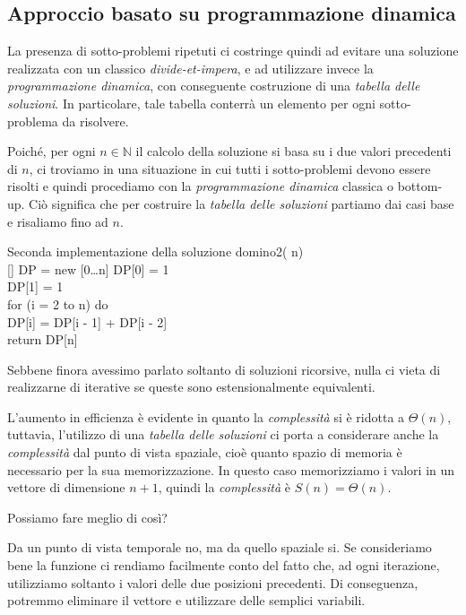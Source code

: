 \subsection{Approccio basato su programmazione dinamica}
La presenza di sotto-problemi ripetuti ci costringe quindi ad evitare una
soluzione realizzata con un classico \emph{divide-et-impera}, e ad utilizzare
invece la \emph{programmazione dinamica}, con conseguente costruzione di una
\emph{tabella delle soluzioni}. In particolare, tale tabella conterrà un elemento
per ogni sotto-problema da risolvere.

Poiché, per ogni $n\in\mathbb{N}$ il calcolo della soluzione si basa su i due
valori precedenti di $n$, ci troviamo in una situazione in cui tutti i
sotto-problemi devono essere risolti e quindi procediamo con la
\emph{programmazione dinamica} classica o bottom-up. Ciò significa che per
costruire la \emph{tabella delle soluzioni} partiamo dai casi base e risaliamo
fino ad $n$.

\begin{minicode}{Seconda implementazione della soluzione}
    \ind{} domino2( n)\\
        [] DP = new [0\dots n]\hfill{}
        DP[0] = 1\\
        DP[1] = 1\\
        \indf for (i = 2 to n) do\\
            DP[i] = DP[i - 1] + DP[i - 2]\\
        \indf return DP[n]
\end{minicode}
\begin{note}
    Sebbene finora avessimo parlato soltanto di soluzioni ricorsive, nulla ci
    vieta di realizzarne di iterative se queste sono estensionalmente equivalenti.
\end{note}\noindent
L'aumento in efficienza è evidente in quanto la \emph{complessità} si è ridotta
a $\Theta(n)$, tuttavia, l'utilizzo di una \emph{tabella delle soluzioni} ci
porta a considerare anche la \emph{complessità} dal punto di vista spaziale, cioè
quanto spazio di memoria è necessario per la sua memorizzazione. In questo caso
memorizziamo i valori in un vettore di dimensione $n+1$, quindi la
\emph{complessità} è $S(n)=\Theta(n)$.

\bigskip\noindent Possiamo fare meglio di così?

Da un punto di vista temporale no, ma da quello spaziale si. Se consideriamo bene
la funzione ci rendiamo facilmente conto del fatto che, ad ogni iterazione,
utilizziamo soltanto i valori delle due posizioni precedenti. Di conseguenza,
potremmo eliminare il vettore e utilizzare delle semplici variabili.

